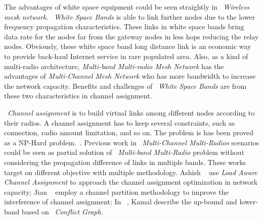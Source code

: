The advantages of white space equipment could be seen straightly in ~\emph{Wireless mesh network}.
~\emph{White Space Bands} is able to link further nodes due to the lower frequency propagation characteristics.
These links in white space bands bring data rate for the nodes far from the gateway nodes in less hops reducing the relay nodes.
Obviously, these white space band long distance link is an economic way to provide back-haul Internet service in rare populated area.
Also, as a kind of multi-radio architecture, \emph{Multi-band Multi-radio Mesh Network} has the advantages of \emph{Multi-Channel Mesh Network} who has more bandwidth to increase the network capacity. 
Benefits and challenges of ~\emph{White Space Bands} are from these two characteristics in channel assignment. 

~\emph{Channel assignment} is to build virtual links among different nodes according to their radios. A channel assignment has to keep several constraints, such as connection, radio amount limitation, and so on.
The problem is has been proved as a NP-Hard problem.~\cite{jain2005impact}. 
Previous work in ~\emph{Multi-Channel Multi-Radios} scenarios could be seen as partial solution of ~\emph{Multi-band Multi-Radio} problem without considering the propagation difference of links in multiple bands.
These works target on different objective with multiple methodology. Ashish ~\cite{raniwala2004centralized} use \emph{Load Aware Channel Assignment} to approach the channel assignment optimization in network capacity; Jian ~\cite{tang2005interference} employ a channel partition methodology to improve the interference of channel assignment; In ~\cite{jain2005impact}, Kamal describe the up-bound and lower-band based on ~\emph{Conflict Graph}.




